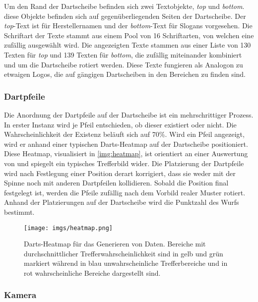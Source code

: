 Um den Rand der Dartscheibe befinden sich zwei Textobjekte, \textit{top} und \textit{bottom}. diese Objekte befinden sich auf gegenüberliegenden Seiten der Dartscheibe. Der \textit{top}-Text ist für Herstellernamen und der \textit{bottom}-Text für Slogans vorgesehen. Die Schriftart der Texte stammt aus einem Pool von 16 Schriftarten, von welchen eine zufällig ausgewählt wird. Die angezeigten Texte stammen aus einer Liste von 130 Texten für \textit{top} und 139 Texten für \textit{bottom}, die zufällig miteinander kombiniert und um die Dartscheibe rotiert werden. Diese Texte fungieren als Analogon zu etwaigen Logos, die auf gängigen Dartscheiben in den Bereichen zu finden sind.

\subsubsection{Dartpfeile}
\label{sec:impl:daten:python:pfeile}

Die Anordnung der Dartpfeile auf der Dartscheibe ist ein mehrschrittiger Prozess. In erster Instanz wird je Pfeil entschieden, ob dieser existiert oder nicht. Die Wahrscheinlichkeit der Existenz beläuft sich auf 70\%. Wird ein Pfeil angezeigt, wird er anhand einer typischen Darts-Heatmap auf der Dartscheibe positioniert. Diese Heatmap, visualisiert in \autoref{img:heatmap}, ist orientiert an einer Auswertung von \cite{heatmap} und spiegelt ein typisches Trefferbild wider. Die Platzierung der Dartpfeile wird nach Festlegung einer Position derart korrigiert, dass sie weder mit der Spinne noch mit anderen Dartpfeilen kollidieren. Sobald die Position final festgelegt ist, werden die Pfeile zufällig nach dem Vorbild realer Muster rotiert. Anhand der Platzierungen auf der Dartscheibe wird die Punktzahl des Wurfs bestimmt.

\begin{figure}
    \centering
    \texttt{[image: imgs/heatmap.png]}
    \caption{Darts-Heatmap für das Generieren von Daten. Bereiche mit durchschnittlicher Trefferwahrscheinlichkeit sind in gelb und grün markiert während in blau unwahrscheinliche Trefferbereiche und in rot wahrscheinliche Bereiche dargestellt sind.}
    \label{img:heatmap}
\end{figure}

\subsubsection{Kamera}
\label{sec:impl:daten:python:kamera}

